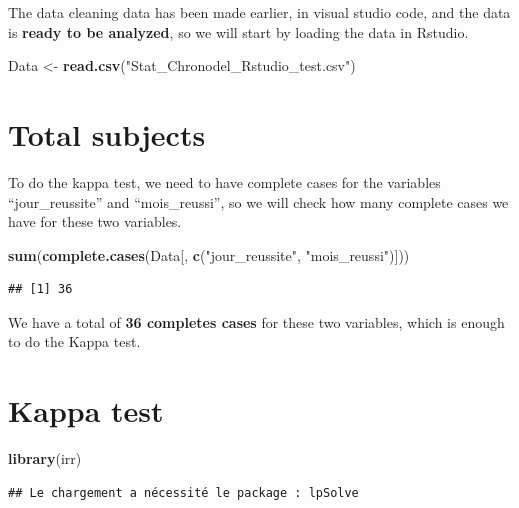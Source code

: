 \documentclass[
]{article}
\newenvironment{Shaded}{\begin{snugshade}}{\end{snugshade}}
\newcommand{\FunctionTok}[1]{\textcolor[rgb]{0.13,0.29,0.53}{\textbf{#1}}}
\newcommand{\NormalTok}[1]{#1}
\newcommand{\OtherTok}[1]{\textcolor[rgb]{0.56,0.35,0.01}{#1}}
\newcommand{\StringTok}[1]{\textcolor[rgb]{0.31,0.60,0.02}{#1}}
\begin{document}
The data cleaning data has been made earlier, in visual studio code, and
the data is \textbf{ready to be analyzed}, so we will start by loading
the data in Rstudio.

\begin{Shaded}
\begin{Highlighting}[]
\NormalTok{Data }\OtherTok{\textless{}{-}} \FunctionTok{read.csv}\NormalTok{(}\StringTok{"Stat\_Chronodel\_Rstudio\_test.csv"}\NormalTok{)}
\end{Highlighting}
\end{Shaded}

\section{Total subjects}\label{total-subjects}

To do the kappa test, we need to have complete cases for the variables
``jour\_reussite'' and ``mois\_reussi'', so we will check how many
complete cases we have for these two variables.

\begin{Shaded}
\begin{Highlighting}[]
\FunctionTok{sum}\NormalTok{(}\FunctionTok{complete.cases}\NormalTok{(Data[, }\FunctionTok{c}\NormalTok{(}\StringTok{"jour\_reussite"}\NormalTok{, }\StringTok{"mois\_reussi"}\NormalTok{)]))}
\end{Highlighting}
\end{Shaded}

\begin{verbatim}
## [1] 36
\end{verbatim}

We have a total of \textbf{36 completes cases} for these two variables,
which is enough to do the Kappa test.

\section{Kappa test}\label{kappa-test}

\begin{Shaded}
\begin{Highlighting}[]
\FunctionTok{library}\NormalTok{(irr)}
\end{Highlighting}
\end{Shaded}

\begin{verbatim}
## Le chargement a nécessité le package : lpSolve
\end{verbatim}
\end{document}

